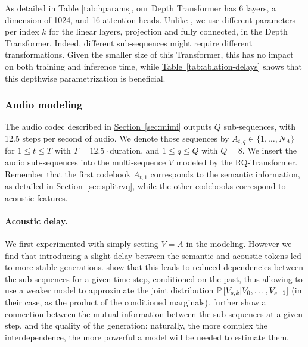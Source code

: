 As detailed in \hyperref[tab:hparams]{Table \ref{tab:hparams}}, our Depth Transformer has 6 layers, a dimension of 1024, and 16 attention heads. Unlike \citet{rqtransformer,uniaudio,zhu2024generativepretrainedspeechlanguage}, we use different parameters per index $k$ for the linear layers, projection and fully connected, in the Depth Transformer. Indeed, different sub-sequences might require different transformations. Given the smaller size of this Transformer, this has no impact on both training and inference time, while \hyperref[tab:ablation-delays]{Table~\ref{tab:ablation-delays}} shows that this depthwise parametrization is beneficial. 

\subsubsection{Audio modeling}
\label{sec:audio_modeling}

The audio codec \mimi{} described in \hyperref[sec:mimi]{Section~\ref{sec:mimi}} outputs $Q$ sub-sequences, with 12.5 steps per second of audio. We denote those sequences by $A_{t, q} \in \{1, \ldots, N_A\}$ for $1 \leq t \leq T$ with $T = 12.5 \cdot \mathrm{duration}$, and $1 \leq q \leq Q$ with $Q=8$. 
We insert the audio sub-sequences into the multi-sequence $V$ modeled by the RQ-Transformer. Remember that the first codebook $A_{t, 1}$ corresponds to the semantic information, as detailed in \hyperref[sec:splitrvq]{Section~\ref{sec:splitrvq}}, while the other codebooks correspond to acoustic features. 

\paragraph{Acoustic delay.}

We first experimented with simply setting $V = A$ in the modeling. However we find that introducing a slight delay between the semantic and acoustic tokens led to more stable generations. \citet{musicgen} show that this leads to reduced dependencies between the sub-sequences for a given time step, conditioned on the past, thus allowing to use a weaker model to approximate the joint distribution $\mathbb{P}\left[V_{s, k} | V_{0}, \ldots, V_{s-1}\right]$ (in their case, as the product of the conditioned marginals). \citet{lemercier2024mmd} further show a connection between the mutual information between the sub-sequences at a given step, and the quality of the generation: naturally, the more complex the interdependence, the more powerful a model will be needed to estimate them. 

